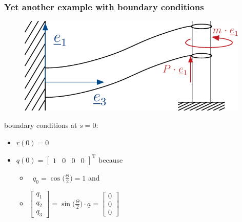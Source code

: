 \begin{frame}
  \frametitle{Yet another example with boundary conditions}
  \vspace{-0.5em}
  \begin{multicols}{2}
    \noindent
    \begin{figure}
      \centering
      \includegraphics[width=11cm, keepaspectratio=true]{sections/cosserat_rods/images/YetAnotherExampleWithBC}
    \end{figure}
  
    boundary conditions at $s=0$:
    \begin{itemize}
      \item $\underline{r}(0) = \underline{0}$
      \item $\underline{q}(0) =
        \begin{bmatrix}
          1 & 0 & 0 & 0
        \end{bmatrix}^{\mathrm{T}}$ because
        \begin{itemize}
          \item $\: \: \, q_0 = \cos\bigl( \frac{\Theta}{2} \bigr) = 1$ and
          \item $\begin{bmatrix}
          q_1 \\ q_2 \\ q_3
        \end{bmatrix} = \sin \bigl( \frac{\Theta}{2} \bigr) \cdot \underline{a} =
        \begin{bmatrix}
          0 \\ 0 \\ 0
        \end{bmatrix}$
      \end{itemize}
    \end{itemize}
    \vspace{2em}


\end{multicols}
\end{frame}
